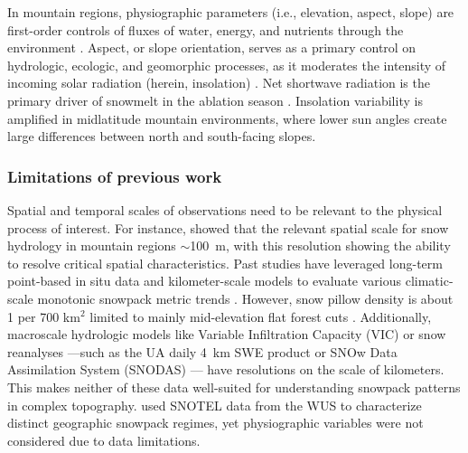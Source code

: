 In mountain regions, physiographic parameters (i.e., elevation, aspect, slope) are first-order controls of fluxes of water, energy, and nutrients through the environment \citep{pelletierWhichWayYou2018a}. Aspect, or slope orientation, serves as a primary control on hydrologic, ecologic, and geomorphic processes, as it moderates the intensity of incoming solar radiation (herein, insolation) \citep{broxtonRoleAspectQuantify2009}. Net shortwave radiation is the primary driver of snowmelt in the ablation season \citep{marksClimateEnergyExchange1992a}. Insolation variability is amplified in midlatitude mountain environments, where lower sun angles create large differences between north and south-facing slopes. 

\hypertarget{ch2-intro-4}{\subsubsection{Limitations of previous work}\label{ch2-intro-4}}


Spatial and temporal scales of observations need to be relevant to the physical process of interest. For instance, \cite{bloschlScalingIssuesSnow1999} showed that the relevant spatial scale for snow hydrology in mountain regions $\sim$100~m, with this resolution showing the ability to resolve critical spatial characteristics. Past studies have leveraged long-term point-based in situ data \citep{clowChangesTimingSnowmelt2010,harpoldChangesSnowpackAccumulation2012a,kapnickCausesRecentChanges2012,musselmanWinterMeltTrends2021} and kilometer-scale models to evaluate various climatic-scale monotonic snowpack metric trends 
\citep{moteDECLININGMOUNTAINSNOWPACK2005, moteDramaticDeclinesSnowpack2018, zengSnowpackChange19822018, haleDriversSpatiotemporalPatterns2023}. However, snow pillow density is about 1 per 700 km$^{2}$ limited to mainly mid-elevation flat forest cuts \citep{guan20102011Snow2013}. Additionally, macroscale hydrologic models like Variable Infiltration Capacity (VIC) \citep{liangSimpleHydrologicallyBased1994} or snow reanalyses ---such as the UA daily 4~km SWE product \citep{broxtonLinkingSnowfallSnow2016} or SNOw Data Assimilation System (SNODAS) \citep{barrettNationalOperationalHydrologic2003} --- have resolutions on the scale of kilometers. This makes neither of these data well-suited for understanding snowpack patterns in complex topography. \cite{trujilloSnowpackRegimesWestern2014} used SNOTEL data from the WUS to characterize distinct geographic snowpack regimes, yet physiographic variables were not considered due to data limitations.


